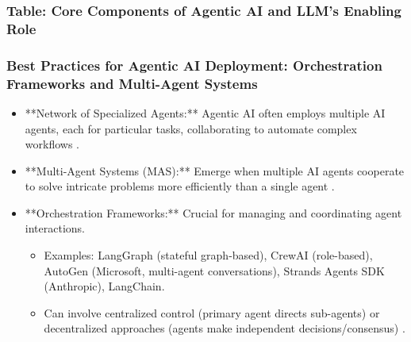 \documentclass{beamer}       %
\begin{document}
\begin{frame}
    \frametitle{Table: Core Components of Agentic AI and LLM's Enabling Role}
\end{frame}

\begin{frame}
    \frametitle{Best Practices for Agentic AI Deployment: Orchestration Frameworks and Multi-Agent Systems}
    \begin{itemize}
        \item **Network of Specialized Agents:** Agentic AI often employs multiple AI agents, each for particular tasks, collaborating to automate complex workflows .
        \item **Multi-Agent Systems (MAS):** Emerge when multiple AI agents cooperate to solve intricate problems more efficiently than a single agent .
        \item **Orchestration Frameworks:** Crucial for managing and coordinating agent interactions.
        \begin{itemize}
            \item Examples: LangGraph (stateful graph-based), CrewAI (role-based), AutoGen (Microsoft, multi-agent conversations), Strands Agents SDK (Anthropic), LangChain.
            \item Can involve centralized control (primary agent directs sub-agents) or decentralized approaches (agents make independent decisions/consensus) .
        \end{itemize}
    \end{itemize}
\end{frame}
\end{document}
